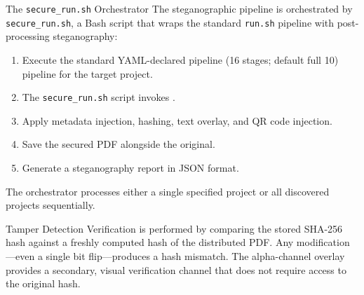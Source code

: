 \documentclass[
  ignorenonframetext,
]{beamer}
\providecommand{\tightlist}{%
  \setlength{\itemsep}{0pt}\setlength{\parskip}{0pt}}
\begin{document}
\begin{frame}{The \texttt{secure\_run.sh}
Orchestrator}
\protect{}\label{the-secure_run.sh-orchestrator}
The steganographic pipeline is orchestrated by \texttt{secure\_run.sh},
a Bash script that wraps the standard \texttt{run.sh} pipeline with
post-processing steganography:

\begin{enumerate}
\tightlist
\item
  Execute the standard YAML-declared pipeline (16 stages; default full
  10) pipeline for the target project.
\item
  The \texttt{secure\_run.sh} script invokes
  .
\item
  Apply metadata injection, hashing, text overlay, and QR code
  injection.
\item
  Save the secured PDF alongside the original.
\item
  Generate a steganography report in JSON format.
\end{enumerate}

The orchestrator processes either a single specified project or all
discovered projects sequentially.
\end{frame}

\begin{frame}[allowframebreaks]{Tamper Detection}
\protect{}\label{tamper-detection}
Verification is performed by comparing the stored SHA-256 hash against a
freshly computed hash of the distributed PDF. Any modification---even a
single bit flip---produces a hash mismatch. The alpha-channel overlay
provides a secondary, visual verification channel that does not require
access to the original hash.
\end{frame}
\end{document}
